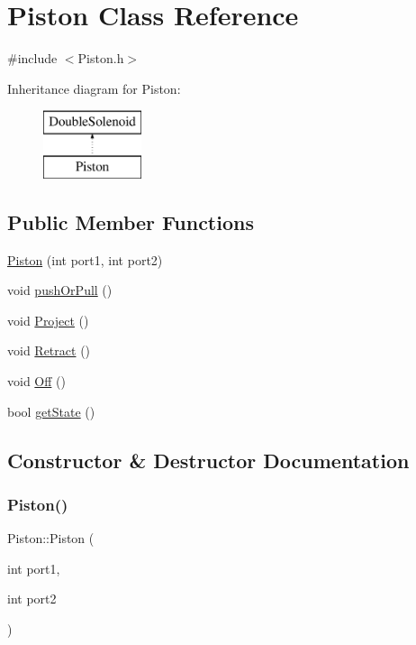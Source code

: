 \hypertarget{classPiston}{}\section{Piston Class Reference}
\label{classPiston}


{\ttfamily \#include $<$Piston.\+h$>$}

Inheritance diagram for Piston\+:\begin{figure}[H]
\begin{center}
\leavevmode
\includegraphics[height=2.000000cm]{classPiston}
\end{center}
\end{figure}
\subsection*{Public Member Functions}
\begin{DoxyCompactItemize}
\item 
\hyperlink{classPiston_ab54d5ba7208da5c829c818830f36bff3}{Piston} (int port1, int port2)
\item 
void \hyperlink{classPiston_ad41333bdc156996df7552b766073be3d}{push\+Or\+Pull} ()
\item 
void \hyperlink{classPiston_ad02eef5cfb0ed9f92ee4605dadb46440}{Project} ()
\item 
void \hyperlink{classPiston_a37038045cb847723f935f625f4ff6d84}{Retract} ()
\item 
void \hyperlink{classPiston_a44a19e212f16a4793b125d2725c470ce}{Off} ()
\item 
bool \hyperlink{classPiston_aee30a006d82ac06ed12ea36d2d435708}{get\+State} ()
\end{DoxyCompactItemize}


\subsection{Constructor \& Destructor Documentation}
\mbox{\label{classPiston_ab54d5ba7208da5c829c818830f36bff3}} 
\subsubsection{\texorpdfstring{Piston()}{Piston()}}
{\footnotesize\ttfamily Piston\+::\+Piston (\begin{DoxyParamCaption}\item[{int}]{port1,  }\item[{int}]{port2 }\end{DoxyParamCaption})\hspace{0.3cm}{\ttfamily [inline]}}



